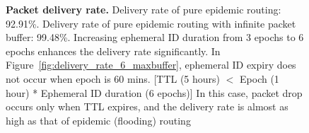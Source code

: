 \documentclass[11pt]{article}
\begin{document}
\begin{figure}[h!]
\center
{}
{}
{}
\caption{{\bf Packet delivery rate.} 
Delivery rate of pure epidemic routing: 92.91\%.  
Delivery rate of pure epidemic routing with infinite packet buffer: 99.48\%.
Increasing ephemeral ID duration from 3 epochs to 6 epochs enhances the delivery rate significantly. 
In Figure~\ref{fig:delivery_rate_6_maxbuffer}, ephemeral ID expiry does not occur when epoch is 60 mins. 
[TTL (5 hours) $<$ Epoch (1 hour) * Ephemeral ID duration (6 epochs)]
In this case, packet drop occurs only when TTL expires, and the delivery rate is almost as high as that of epidemic (flooding) routing 
}
\label{fig:delivery_rate}
\end{figure}
\end{document}
